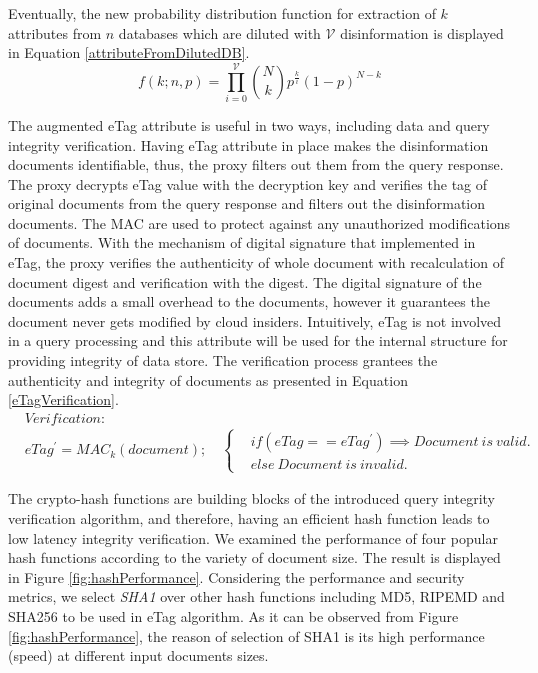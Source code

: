 Eventually, the new probability distribution function for extraction of $k$ attributes from $n$ databases which are diluted with $\mathcal{V}$ disinformation is displayed in Equation \ref{attributeFromDilutedDB}.
\begin{equation}
\label{attributeFromDilutedDB}
f(k;n,p) = \prod_{i=0}^{\mathcal{V}} {{N} \choose {k}}p^{\frac{k}{i}}(1-p)^{N-k}
\end{equation}

\medskip

 The augmented eTag attribute is useful in two ways, including data and query integrity verification. Having eTag attribute in place makes the disinformation documents identifiable, thus, the proxy filters out them from the query response. The proxy decrypts eTag value with the decryption key and verifies the tag of original documents from the query response and filters out the disinformation documents. The MAC are used to protect against any unauthorized modifications of documents. With the mechanism of digital signature that implemented in eTag, the proxy verifies the authenticity of whole document with recalculation of document digest and verification with the digest. The digital signature of the documents adds a small overhead to the documents, however it guarantees the document never gets modified by cloud insiders. Intuitively, eTag is not involved in a query processing and this attribute will be used for the internal structure for providing integrity of data store. The verification process grantees the authenticity and integrity of documents as presented in Equation \ref{eTagVerification}.
\begin{equation}
\label{eTagVerification}
\begin{aligned}
&Verification: \\
&eTag^{'}= MAC_k(document); \quad \begin{cases}
&if (eTag==eTag^{'}) \implies Document~is~valid.\\
&else~ Document~ is~ invalid. 
\end{cases}
\end{aligned}
\end{equation}


The crypto-hash functions are building blocks of the introduced query integrity verification algorithm, and therefore, having an efficient hash function leads to low latency integrity verification. We examined the performance of four popular hash functions according to the variety of document size. The result is displayed in Figure \ref{fig:hashPerformance}. Considering the performance and security metrics, we select \emph{SHA1} over other hash functions including MD5, RIPEMD and SHA256 to be used in eTag algorithm. As it can be observed from Figure \ref{fig:hashPerformance}, the reason of selection of SHA1 is its high performance (speed) at different input documents sizes.

